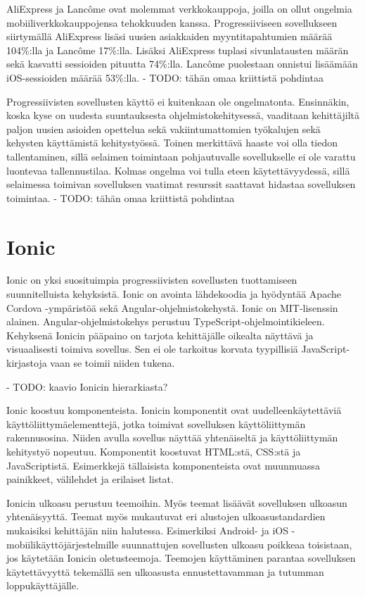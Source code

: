 \documentclass[utf8]{gradu3}
\begin{document}
AliExpress ja Lancôme ovat molemmat verkkokauppoja, joilla on ollut ongelmia mobiiliverkkokauppojensa tehokkuuden kanssa. Progressiiviseen sovellukseen siirtymällä AliExpress lisäsi uusien asiakkaiden myyntitapahtumien määrää 104\%:lla ja Lancôme 17\%:lla. Lisäksi AliExpress tuplasi sivunlatausten määrän sekä kasvatti sessioiden pituutta 74\%:lla. Lancôme puolestaan onnistui lisäämään iOS-sessioiden määrää 53\%:lla. \parencite[]{beginners-guide-pwa}
- TODO: tähän omaa kriittistä pohdintaa

Progressiivisten sovellusten käyttö ei kuitenkaan ole ongelmatonta. Ensinnäkin, koska kyse on uudesta suuntauksesta ohjelmistokehitysessä, vaaditaan kehittäjiltä paljon uusien asioiden opettelua sekä vakiintumattomien työkalujen sekä kehysten käyttämistä kehitystyössä. Toinen merkittävä haaste voi olla tiedon tallentaminen, sillä selaimen toimintaan pohjautuvalle sovellukselle ei ole varattu luontevaa tallennustilaa. Kolmas ongelma voi tulla eteen käytettävyydessä, sillä selaimessa toimivan sovelluksen vaatimat resurssit saattavat hidastaa sovelluksen toimintaa. \parencite[]{pwa-design-challenges}
- TODO: tähän omaa kriittistä pohdintaa

\section{Ionic}

Ionic on yksi suosituimpia progressiivisten sovellusten tuottamiseen suunnitelluista kehyksistä. Ionic on avointa lähdekoodia ja hyödyntää Apache Cordova -ympäristöä sekä Angular-ohjelmistokehystä. Ionic on MIT-lisenssin alainen. Angular-ohjelmistokehys perustuu TypeScript-ohjelmointikieleen. Kehyksenä Ionicin pääpaino on tarjota kehittäjälle oikealta näyttävä ja visuaalisesti toimiva sovellus. Sen ei ole tarkoitus korvata tyypillisiä JavaScript-kirjastoja vaan se toimii niiden tukena. \parencite[]{ionic-documentation}

- TODO: kaavio Ionicin hierarkiasta?

Ionic koostuu komponenteista. Ionicin komponentit ovat uudelleenkäytettäviä käyttöliittymäelementtejä, jotka toimivat sovelluksen käyttöliittymän rakennusosina. Niiden avulla sovellus näyttää yhtenäiseltä ja käyttöliittymän kehitystyö nopeutuu. Komponentit koostuvat HTML:stä, CSS:stä ja JavaScriptistä. Esimerkkejä tällaisista komponenteista ovat muunmuassa painikkeet, välilehdet ja erilaiset listat.

Ionicin ulkoasu perustuu teemoihin. Myös teemat lisäävät sovelluksen ulkoasun yhtenäisyyttä. Teemat myös mukautuvat eri alustojen ulkoasustandardien mukaisiksi kehittäjän niin halutessa. Esimerkiksi Android- ja iOS -mobiilikäyttöjärjestelmille suunnattujen sovellusten ulkoasu poikkeaa toisistaan, jos käytetään Ionicin oletusteemoja. Teemojen käyttäminen parantaa sovelluksen käytettävyyttä tekemällä sen ulkoasusta ennustettavamman ja tutumman loppukäyttäjälle.
\end{document}

